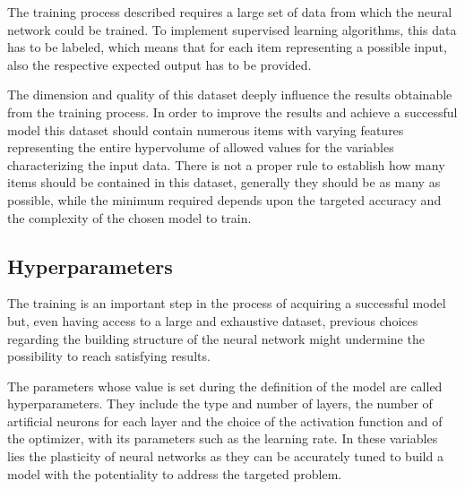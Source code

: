 \documentclass[a4paper,10pt]{report}
\begin{document}
The training process described requires a large set of data from which 
the neural network could be trained.
To implement supervised learning algorithms, this data has to be labeled, which means that
for each item representing a possible input, also the respective 
expected output has to be provided.


The dimension and quality of this 
dataset deeply influence the results obtainable from the training process.
In order to improve the results and achieve a successful model 
this dataset should contain numerous items with varying features
representing the entire hypervolume of allowed values for the variables
characterizing the input data.
There is not a proper rule to establish how many items should be contained 
in this dataset, generally they should be as many as possible, while 
the minimum required depends upon the targeted accuracy and the complexity of
the chosen model to train.


\subsection{Hyperparameters}

The training is an important step in the process of acquiring a successful model but, even
having access to a large and exhaustive dataset, previous choices regarding the 
building structure of the neural network might undermine the possibility to reach
satisfying results.

The parameters whose value is set during the definition of the model are called hyperparameters.
They include the type and number of layers, the number of artificial neurons for each layer and
the choice of the activation function and of the optimizer, with
its parameters such as the learning rate. In these variables lies the plasticity of neural networks as
they can be accurately tuned to build a model with the potentiality 
to address the targeted problem.
\end{document}
